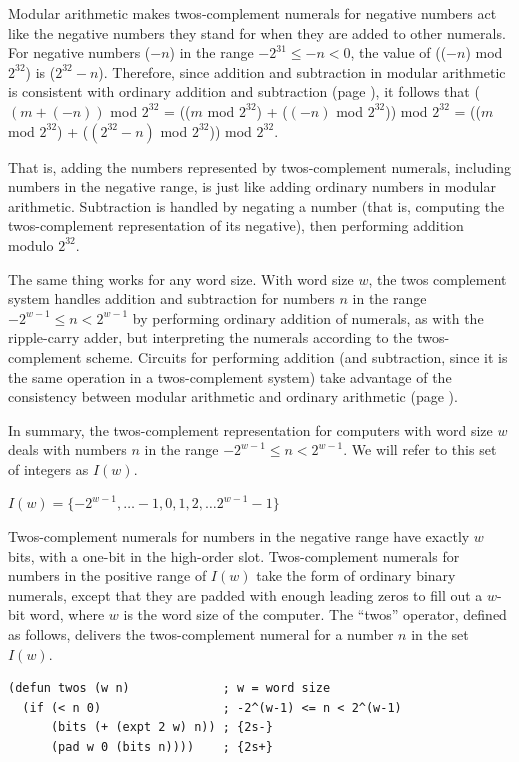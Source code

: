 Modular arithmetic makes twos-complement numerals
for negative numbers act like the negative numbers they stand for
when they are added to other numerals.
For negative numbers ($-n$) in the range $-2^{31} \le -n < 0$,
the value of (($-n$) mod $2^{32}$) is ($2^{32}-n$).
Therefore, since addition and subtraction
in modular arithmetic is consistent with ordinary addition and subtraction
(page \pageref{modular-arithmetic}), it follows that
  ($(m+(-n))$ mod $2^{32}$
= (($m$ mod $2^{32}$) + ($(-n)$ mod $2^{32}$)) mod $2^{32}$
= (($m$ mod $2^{32}$) + ($(2^{32} - n)$ mod $2^{32}$)) mod $2^{32}$.

That is, adding the numbers represented by twos-complement
numerals, including numbers in the negative range,
is just like adding ordinary numbers in modular arithmetic.
Subtraction is handled by negating a number
(that is, computing the twos-complement representation
of its negative), then performing addition modulo $2^{32}$.

The same thing works for any word size.
With word size $w$, the twos complement system
handles addition and subtraction for numbers $n$
in the range $-2^{w-1} \leq n < 2^{w-1}$
by performing ordinary addition of numerals,
as with the ripple-carry adder, but interpreting
the numerals according to the twos-complement scheme.
Circuits for performing addition (and subtraction, since
it is the same operation in a twos-complement system)
take advantage of the consistency between modular arithmetic
and ordinary arithmetic (page \pageref{modular-arithmetic}).

In summary, the twos-complement representation for computers with
word size $w$ deals with numbers $n$ in the range
$-2^{w-1} \leq n < 2^{w-1}$.
We will refer to this set of integers as $I(w)$.
\label{def-Iw}
\begin{center}
$I(w) = \{-2^{w-1}, \dots -1, 0, 1, 2, \dots 2^{w-1}-1\}$
\end{center}

Twos-complement numerals for numbers in the negative range
have exactly $w$ bits, with a one-bit in the high-order slot.
Twos-complement numerals for numbers in the positive range of $I(w)$
take the form of ordinary binary numerals, except that
they are padded with enough leading zeros
to fill out a $w$-bit word, where $w$ is the word size of the computer.
The ``twos'' operator, defined as follows, delivers the twos-complement numeral
for a number $n$ in the set $I(w)$.

\label{twos-defun}
\begin{Verbatim}
(defun twos (w n)             ; w = word size
  (if (< n 0)                 ; -2^(w-1) <= n < 2^(w-1)
      (bits (+ (expt 2 w) n)) ; {2s-}
      (pad w 0 (bits n))))    ; {2s+}
\end{Verbatim}

